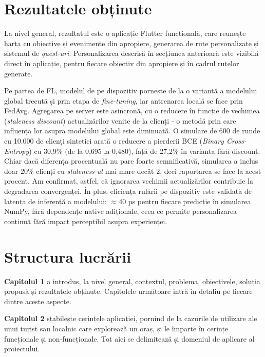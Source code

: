 \documentclass[12pt,a4paper]{report}
\begin{document}
\section{Rezultatele obținute}

La nivel general, rezultatul este o aplicație Flutter funcțională, care reunește harta cu obiective și evenimente din apropiere, generarea de rute personalizate și sistemul de \textit{quest-uri}. Personalizarea descrisă în secțiunea anterioară este vizibilă direct în aplicație, pentru fiecare obiectiv din apropiere și în cadrul rutelor generate.

Pe partea de FL, modelul de pe dispozitiv pornește de la o variantă a modelului global trecută și prin etapa de \textit{fine-tuning}, iar antrenarea locală se face prin FedAvg. Agregarea pe server este asincronă, cu o reducere în funcție de vechimea (\textit{staleness discount}) actualizărilor venite de la clienți \cite{xie2019fedasync} - o metodă prin care influența lor asupra modelului global este diminuată. O simulare de 600 de runde cu 10.000 de clienți sintetici arată o reducere a pierderii BCE (\textit{Binary Cross-Entropy}) cu 30,9\% (de la 0,695 la 0,480), față de 27,2\% în varianta fără discount. Chiar dacă diferența procentuală nu pare foarte semnificativă, simularea a inclus doar 20\% clienți cu \textit{staleness-ul} mai mare decât 2, deci raportarea se face la acest procent. Am confirmat, astfel, că ignorarea vechimii actualizărilor contribuie la degradarea convergenței. În plus, eficiența rulării pe dispozitiv este validată de latența de inferență a modelului: $\approx$40 µs pentru fiecare predicție în simularea NumPy, fără dependențe native adiționale, ceea ce permite personalizarea continuă fără impact perceptibil asupra experienței.

\section{Structura lucrării}

\textbf{Capitolul 1} a introdus, la nivel general, contextul, problema, obiectivele, soluția propusă și rezultatele obținute. Capitolele următoare intră în detaliu pe fiecare dintre aceste aspecte.

\textbf{Capitolul 2} stabilește cerințele aplicației, pornind de la cazurile de utilizare ale unui turist sau localnic care explorează un oraș, și le împarte în cerințe funcționale și non-funcționale. Tot aici se delimitează și domeniul de aplicare al proiectului.
\end{document}
